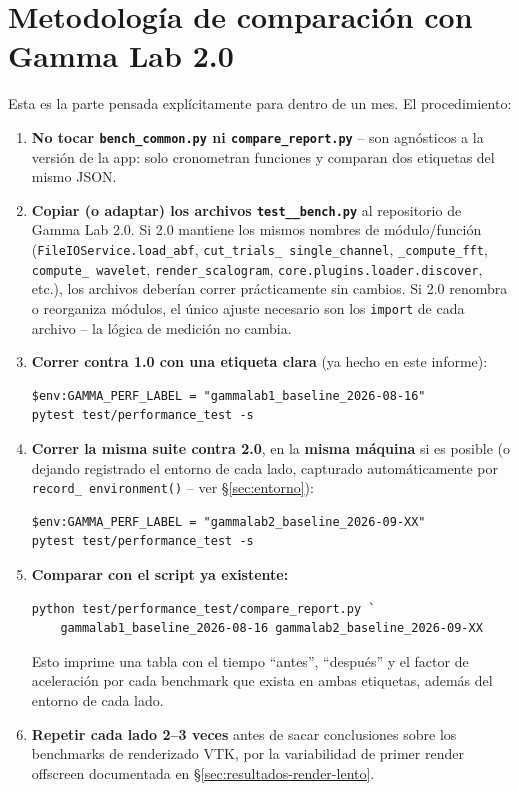 \documentclass[11pt,a4paper]{article}
\begin{document}
\newpage
\section{Metodología de comparación con Gamma Lab 2.0}
\label{sec:comparacion-v2}

Esta es la parte pensada explícitamente para dentro de un mes. El procedimiento:

\begin{enumerate}
  \item \textbf{No tocar \texttt{bench\_\allowbreak common.py} ni \texttt{compare\_\allowbreak report.py}} --
        son agnósticos a la versión de la app: solo cronometran funciones y comparan dos etiquetas del mismo
        JSON.
  \item \textbf{Copiar (o adaptar) los archivos \texttt{test\_\allowbreak *\_\allowbreak bench.py}} al
        repositorio de Gamma Lab 2.0. Si 2.0 mantiene los mismos nombres de módulo/función
        (\texttt{FileIOService.load\_\allowbreak abf}, \texttt{cut\_\allowbreak trials\_\allowbreak
        single\_\allowbreak channel}, \texttt{\_\allowbreak compute\_\allowbreak fft}, \texttt{compute\_\allowbreak
        wavelet}, \texttt{render\_\allowbreak scalogram}, \texttt{core.plugins.loader.discover}, etc.), los
        archivos deberían correr prácticamente sin cambios. Si 2.0 renombra o reorganiza módulos, el único
        ajuste necesario son los \texttt{import} de cada archivo -- la lógica de medición no cambia.
  \item \textbf{Correr contra 1.0 con una etiqueta clara} (ya hecho en este informe):
        \begin{verbatim}
$env:GAMMA_PERF_LABEL = "gammalab1_baseline_2026-08-16"
pytest test/performance_test -s
        \end{verbatim}
  \item \textbf{Correr la misma suite contra 2.0}, en la \textbf{misma máquina} si es posible (o dejando
        registrado el entorno de cada lado, capturado automáticamente por \texttt{record\_\allowbreak
        environment()} -- ver \S\ref{sec:entorno}):
        \begin{verbatim}
$env:GAMMA_PERF_LABEL = "gammalab2_baseline_2026-09-XX"
pytest test/performance_test -s
        \end{verbatim}
  \item \textbf{Comparar con el script ya existente:}
        \begin{verbatim}
python test/performance_test/compare_report.py `
    gammalab1_baseline_2026-08-16 gammalab2_baseline_2026-09-XX
        \end{verbatim}
        Esto imprime una tabla con el tiempo ``antes'', ``después'' y el factor de aceleración por cada
        benchmark que exista en ambas etiquetas, además del entorno de cada lado.
  \item \textbf{Repetir cada lado 2--3 veces} antes de sacar conclusiones sobre los benchmarks de
        renderizado VTK, por la variabilidad de primer render offscreen documentada en
        \S\ref{sec:resultados-render-lento}.
\end{enumerate}
\end{document}
